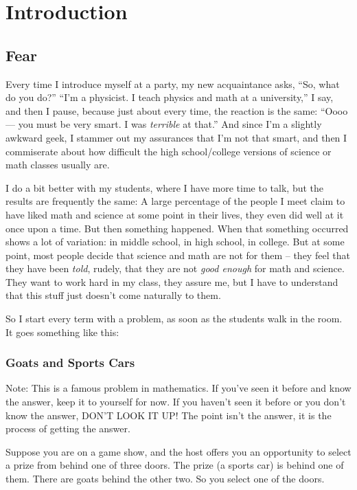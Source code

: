 \chapter{Introduction}

\section{Fear}

Every time I introduce myself at a party, my new acquaintance asks,
``So, what do you do?''  ``I'm a physicist. I teach physics and math
at a university,'' I say, and then I pause, because just about every
time, the reaction is the same: ``Oooo --- you must be very smart.  I
was \emph{terrible} at that.''  And since I'm a slightly awkward geek,
I stammer out my assurances that I'm not that smart, and then I
commiserate about how difficult the high school/college versions of
science or math classes usually are. 


I do a bit better with my students, where I have more time to talk,
but the results are frequently the same: A large percentage of the
people I meet claim to have liked math and science at some point in
their lives, they even did well at it once upon a time.  But then
something happened.  When that something occurred shows a lot of
variation: in middle school, in high school, in college.  But at some
point, most people decide that science and math are not for them --
they feel that they have been \emph{told}, rudely, that they are not
\emph{good enough} for math and science.  They want to work hard in my
class, they assure me, but I have to understand that this stuff just
doesn't come naturally to them.


So I start every term with a problem, as soon as the students walk in
the room.  It goes something like this:

\subsection{Goats and Sports Cars}
Note: This is a famous problem in mathematics.  If you've seen it
before and know the answer, keep it to yourself for now.  If you
haven't seen it before or you don't know the answer, DON'T LOOK IT UP!
The point isn't the answer, it is the process of getting the answer.

Suppose you are on a game show, and the host offers you an opportunity
to select a prize from behind one of three doors.  The prize (a sports
car) is behind one of them.  There are goats behind the other two.  So
you select one of the doors.

